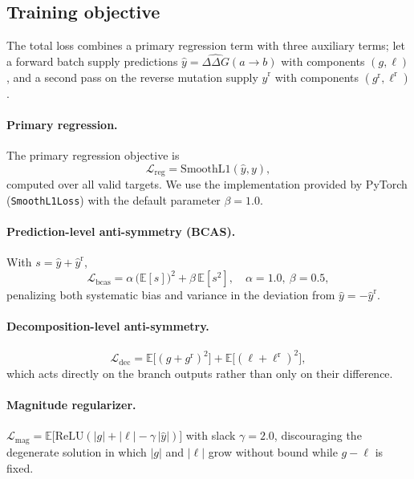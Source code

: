 \documentclass[11pt,a4paper]{article}
\theoremstyle{plain}
\theoremstyle{definition}
\begin{document}
\subsection{Training objective}
\label{sec:objective}

The total loss combines a primary regression term with three auxiliary terms; let a forward batch supply predictions
$\widehat{y} = \widehat{\Delta\Delta G}(a\!\rightarrow\!b)$ with components
$(g, \ell)$, and a second pass on the reverse mutation supply
$\widehat{y}^{\mathrm{r}}$ with components $(g^{\mathrm{r}}, \ell^{\mathrm{r}})$.
\paragraph{Primary regression.}
The primary regression objective is
\[
\mathcal{L}_{\mathrm{reg}}
=
\mathrm{SmoothL1}(\widehat{y}, y),
\]
computed over all valid targets. We use the implementation provided by PyTorch (\texttt{SmoothL1Loss}) with the default parameter $\beta=1.0$.
\paragraph{Prediction-level anti-symmetry (BCAS).}
With $s = \widehat{y} + \widehat{y}^{\mathrm{r}}$,
\begin{equation}
\mathcal{L}_{\mathrm{bcas}} = \alpha\,\big(\mathbb{E}[s]\big)^2 + \beta\,\mathbb{E}[s^2],
\quad \alpha = 1.0,\ \beta = 0.5,
\end{equation}
penalizing both systematic bias and variance in the deviation from
$\widehat{y} = -\widehat{y}^{\mathrm{r}}$.
\paragraph{Decomposition-level anti-symmetry.}
\begin{equation}
\mathcal{L}_{\mathrm{dec}} = \mathbb{E}\big[(g + g^{\mathrm{r}})^2\big] + \mathbb{E}\big[(\ell + \ell^{\mathrm{r}})^2\big],
\end{equation}
which acts directly on the branch outputs rather than only on their difference.
\paragraph{Magnitude regularizer.}
$\mathcal{L}_{\mathrm{mag}} = \mathbb{E}\big[\mathrm{ReLU}(|g| + |\ell| - \gamma\,|\widehat{y}|)\big]$
with slack $\gamma = 2.0$, discouraging the degenerate solution in which $|g|$ and $|\ell|$ grow without bound while $g - \ell$ is fixed.
\end{document}

